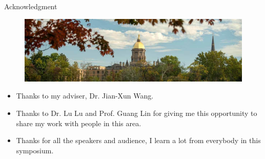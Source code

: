 \documentclass{beamer}
\begin{document}
\begin{frame}{Acknowledgment}
\begin{figure}
\includegraphics[width=1.\textwidth]{ND.jpg}
\end{figure}
\begin{itemize}
	\item Thanks to my adviser, Dr. Jian-Xun Wang.
	\item Thanks to Dr. Lu Lu and Prof. Guang Lin for giving me this opportunity to share my work with people in this area.
	\item Thanks for all the speakers and audience, I learn a lot from everybody in this symposium.
\end{itemize}
\end{frame}

\end{document}
